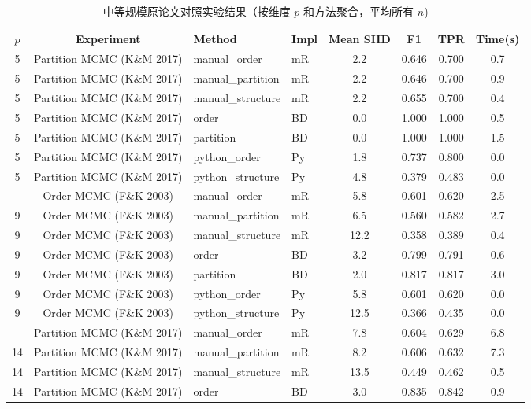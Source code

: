\begin{table}[htbp]
\centering\footnotesize
\caption{中等规模原论文对照实验结果（按维度 $p$ 和方法聚合，平均所有 $n$)}
\label{tab:medium_original_summary}
\setlength{\tabcolsep}{3pt}
\begin{tabular}{c c l l c c c c}
\toprule
$p$ & Experiment & Method & Impl & Mean SHD & F1 & TPR & Time(s) \\
\midrule
5 & Partition MCMC (K\&M 2017) & manual\_order & mR & 2.2 & 0.646 & 0.700 & 0.7 \\
5 & Partition MCMC (K\&M 2017) & manual\_partition & mR & 2.2 & 0.646 & 0.700 & 0.9 \\
5 & Partition MCMC (K\&M 2017) & manual\_structure & mR & 2.2 & 0.655 & 0.700 & 0.4 \\
5 & Partition MCMC (K\&M 2017) & order & BD & 0.0 & 1.000 & 1.000 & 0.5 \\
5 & Partition MCMC (K\&M 2017) & partition & BD & 0.0 & 1.000 & 1.000 & 1.5 \\
5 & Partition MCMC (K\&M 2017) & python\_order & Py & 1.8 & 0.737 & 0.800 & 0.0 \\
5 & Partition MCMC (K\&M 2017) & python\_structure & Py & 4.8 & 0.379 & 0.483 & 0.0 \\
\addlinespace[2pt]
9 & Order MCMC (F\&K 2003) & manual\_order & mR & 5.8 & 0.601 & 0.620 & 2.5 \\
9 & Order MCMC (F\&K 2003) & manual\_partition & mR & 6.5 & 0.560 & 0.582 & 2.7 \\
9 & Order MCMC (F\&K 2003) & manual\_structure & mR & 12.2 & 0.358 & 0.389 & 0.4 \\
9 & Order MCMC (F\&K 2003) & order & BD & 3.2 & 0.799 & 0.791 & 0.6 \\
9 & Order MCMC (F\&K 2003) & partition & BD & 2.0 & 0.817 & 0.817 & 3.0 \\
9 & Order MCMC (F\&K 2003) & python\_order & Py & 5.8 & 0.601 & 0.620 & 0.0 \\
9 & Order MCMC (F\&K 2003) & python\_structure & Py & 12.5 & 0.366 & 0.435 & 0.0 \\
\addlinespace[2pt]
14 & Partition MCMC (K\&M 2017) & manual\_order & mR & 7.8 & 0.604 & 0.629 & 6.8 \\
14 & Partition MCMC (K\&M 2017) & manual\_partition & mR & 8.2 & 0.606 & 0.632 & 7.3 \\
14 & Partition MCMC (K\&M 2017) & manual\_structure & mR & 13.5 & 0.449 & 0.462 & 0.5 \\
14 & Partition MCMC (K\&M 2017) & order & BD & 3.0 & 0.835 & 0.842 & 0.9 \\

\end{tabular}
\end{table}
